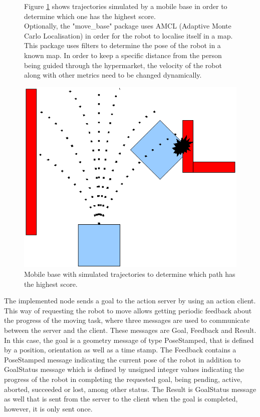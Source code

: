 \begin{figure}[H]
    \centering
    \begin{minipage}[b]{0.57\linewidth}
    Figure \ref{fig:trajecories_mobileBase} shows trajectories simulated by a mobile base in order to determine which one has the highest score.\\
    Optionally, the "move\_base" package uses AMCL (Adaptive Monte Carlo Localisation) in order for the robot to localise itself in a map. This package uses filters to determine the pose of the robot in a known map.
    In order to keep a specific distance from the person being guided through the hypermarket, the velocity of the robot along with other metrics need to be changed dynamically.
    \end{minipage}
    \hspace{0.2cm}
    \begin{minipage}[b]{0.4\linewidth}
    \centering
    \includegraphics[width=\textwidth]{figures/local_plan.png}
    \caption{Mobile base with simulated trajectories to determine which path has the highest score.}
    \label{fig:trajecories_mobileBase}
    \end{minipage}
\end{figure}

The implemented node sends a goal to the action server by using an action client. This way of requesting the robot to move allows getting periodic feedback about the progress of the moving task, where three messages are used to communicate between the server and the client. These messages are Goal, Feedback and Result. In this case, the goal is a geometry message of type PoseStamped, that is defined by a position, orientation as well as a time stamp. The Feedback contains a PoseStamped message indicating the current pose of the robot in addition to GoalStatus message which is defined by unsigned integer values indicating the progress of the robot in completing the requested goal, being pending, active, aborted, succeeded or lost, among other status. The Result is GoalStatus message as well that is sent from the server to the client when the goal is completed, however, it is only sent once.\\

